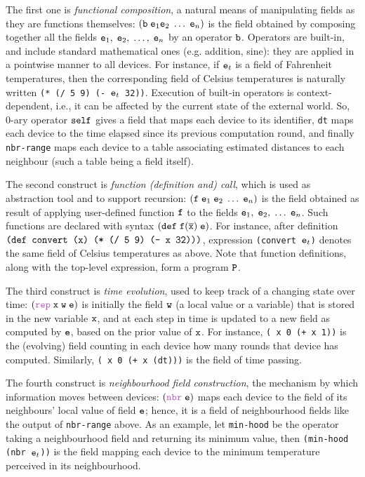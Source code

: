 \documentclass[12pt,a4paper,twoside,openright]{book}
\begin{document}
The first one is \emph{functional composition}, a natural means of manipulating fields as they are functions themselves: $(\texttt{b} \; \texttt{e}_1 \texttt{e}_2\;\ldots\;\texttt{e}_n)$ is the field obtained by composing together all the fields $\texttt{e}_1,\;\texttt{e}_2,\;\ldots,\;\texttt{e}_n$ by an operator $\texttt{b}$.
%
Operators are built-in, and include standard mathematical ones (e.g. addition, sine): they are applied in a pointwise manner to all devices.
%
For instance, if $\texttt{e}_t$ is a field of Fahrenheit temperatures, then the corresponding field of Celsius temperatures is naturally written \mbox{\texttt{(* (/ 5 9) (- $\texttt{e}_t$ 32))}}.
%
Execution of built-in operators is context-dependent, i.e., it can be affected by the current state of the external world.
%
So, 0-ary operator $\texttt{self}$ gives a field that maps each device to its identifier, \texttt{dt} maps each device to the time elapsed since its previous computation round, and finally \texttt{nbr-range} maps each device to a table associating estimated distances to each neighbour (such a table being a field itself).

The second construct is \emph{function (definition and) call}, which is used as abstraction tool and to support recursion: $(\texttt{f} \; \texttt{e}_1\;\texttt{e}_2\;\ldots\;\texttt{e}_n)$ is the field obtained as result of applying user-defined function $\texttt{f}$ to the fields $\texttt{e}_1,\;\texttt{e}_2,\;\ldots\;\texttt{e}_n$. Such functions are declared with syntax $(\texttt{def} \; \texttt{f} (\overline{\texttt{x}}) \; \texttt{e})$.
%
For instance, after definition $\texttt{(\texttt{def}~convert (x) (* (/ 5 9) (- x 32)))}$, expression \texttt{(convert $\texttt{e}_t$)} denotes the same field of Celsius temperatures as above.
%
Note that function definitions, along with the top-level expression, form a program $\texttt{P}$.

The third construct is \emph{time evolution}, used to keep track of a changing state over time: $(\repN \; \xname\; \we \; \e)$ is initially the field $\texttt{w}$ (a local value or a variable) that is stored in the new variable $\texttt{x}$, and at each step in time is updated to a new field as computed by $\texttt{e}$, based on the prior value of $\texttt{x}$.
%
For instance, \mbox{\texttt{(\repN~x 0 (+ x 1))}} is the (evolving) field counting in each device how many rounds that device has computed.
%
Similarly, \mbox{\texttt{(\repN~x 0 (+ x (dt)))}} is the field of time passing.

The fourth construct is \emph{neighbourhood field construction}, the mechanism by which information moves between devices: $(\nbrN \; \e)$ maps each device to the field of its neighbours' local value of field $\texttt{e}$; hence, it is a field of neighbourhood fields like the output of \texttt{nbr-range} above. As an example, let \texttt{min-hood} be the operator taking a neighbourhood field and returning its minimum value, then \texttt{(min-hood (nbr $\texttt{e}_t$))} is the field mapping each device to the minimum temperature perceived in its neighbourhood.
\end{document}
